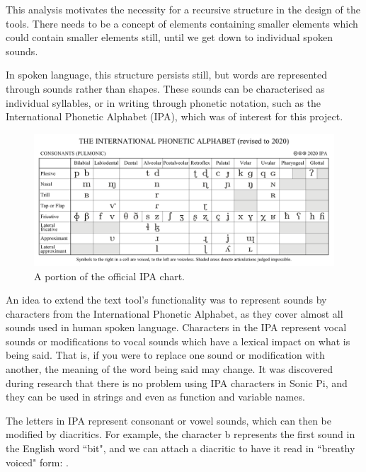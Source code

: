 \documentclass[12pt,a4paper,oneside,openright]{report}
\begin{document}
This analysis motivates the necessity for a recursive structure in the design of the tools. There needs to be a concept of elements containing smaller elements which could contain smaller elements still, until we get down to individual spoken sounds.

In spoken language, this structure persists still, but words are represented through sounds rather than shapes. These sounds can be characterised as individual syllables, or in writing through phonetic notation, such as the International Phonetic Alphabet (IPA), which was of interest for this project.
\begin{figure}[h]
    \centering
    \includegraphics[scale=0.3]{images/IPA.png}
    \caption{A portion of the official IPA chart.\protect\footnotemark}
    \label{fig:ipa_chart}
\end{figure}

An idea to extend the text tool's functionality was to represent sounds by characters from the International Phonetic Alphabet, as they cover almost all sounds used in human spoken language. Characters in the IPA represent vocal sounds or modifications to vocal sounds which have a lexical impact on what is being said. That is, if you were to replace one sound or modification with another, the meaning of the word being said may change. It was discovered during research that there is no problem using IPA characters in Sonic Pi, and they can be used in strings and even as function and variable names.

The letters in IPA represent consonant or vowel sounds, which can then be modified by diacritics. For example, the character b represents the first sound in the English word ``bit", and we can attach a diacritic to have it read in ``breathy voiced" form: .
\end{document}
